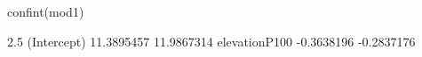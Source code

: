 \begin{Schunk}
\begin{Sinput}
 confint(mod1)
\end{Sinput}
\begin{Soutput}
                   2.5 %     97.5 %
(Intercept)   11.3895457 11.9867314
elevationP100 -0.3638196 -0.2837176
\end{Soutput}
\end{Schunk}

